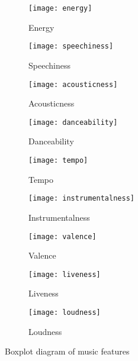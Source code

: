 \begin{figure}
  \begin{subfigure}[b]{0.3\textwidth}
    \texttt{[image: energy]}
    \caption{Energy}
    \label{fig:energy}
  \end{subfigure}
  \hfill
  \begin{subfigure}[b]{0.3\textwidth}
    \texttt{[image: speechiness]}
    \caption{Speechiness}
    \label{fig:speechiness}
  \end{subfigure}
  \hfill
  \begin{subfigure}[b]{0.3\textwidth}
    \texttt{[image: acousticness]}
    \caption{Acousticness}
    \label{fig:acousticness}
  \end{subfigure}
  
  \bigskip
    \begin{subfigure}[b]{0.3\textwidth}
    \texttt{[image: danceability]}
    \caption{Danceability}
    \label{fig:danceability}
  \end{subfigure}
  \hfill
    \begin{subfigure}[b]{0.3\textwidth}
    \texttt{[image: tempo]}
    \caption{Tempo}
    \label{fig:tempo}
  \end{subfigure}
  \hfill
    \begin{subfigure}[b]{0.3\textwidth}
    \texttt{[image: instrumentalness]}
    \caption{Instrumentalness}
    \label{fig:instrumentalness}
  \end{subfigure}
  
  \bigskip
      \begin{subfigure}[b]{0.3\textwidth}
    \texttt{[image: valence]}
    \caption{Valence}
    \label{fig:valence}
  \end{subfigure}
  \hfill
    \begin{subfigure}[b]{0.3\textwidth}
    \texttt{[image: liveness]}
    \caption{Liveness}
    \label{fig:liveness}
  \end{subfigure}
  \hfill
    \begin{subfigure}[b]{0.3\textwidth}
    \texttt{[image: loudness]}
    \caption{Loudness}
    \label{fig:loudness}
  \end{subfigure}
  
  \caption{Boxplot diagram of music features}
  \label{fig:boxplot}
\end{figure}

